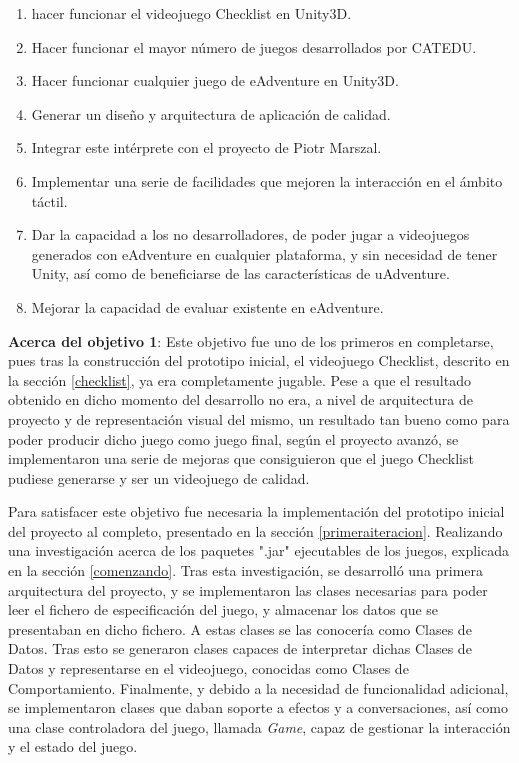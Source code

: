 \begin{enumerate}
	\item hacer funcionar el videojuego Checklist en Unity3D.
	
	\item Hacer funcionar el mayor número de juegos desarrollados por CATEDU.
	
	\item Hacer funcionar cualquier juego de eAdventure en Unity3D.
	
	\item Generar un diseño y arquitectura de aplicación de calidad.
	
	\item Integrar este intérprete con el proyecto de Piotr Marszal.
	
	\item Implementar una serie de facilidades que mejoren la interacción en el ámbito táctil.
	
	\item Dar la capacidad a los no desarrolladores, de poder jugar a videojuegos generados con eAdventure en cualquier plataforma, y sin necesidad de tener Unity, así como de beneficiarse de las características de uAdventure.
	
	\item Mejorar la capacidad de evaluar existente en eAdventure.
\end{enumerate}

\textbf{Acerca del objetivo 1}: Este objetivo fue uno de los primeros en completarse, pues tras la construcción del prototipo inicial, el videojuego Checklist, descrito en la sección \ref{checklist}, ya era completamente jugable. Pese a que el resultado obtenido en dicho momento del desarrollo no era, a nivel de arquitectura de proyecto y de representación visual del mismo, un resultado tan bueno como para poder producir dicho juego como juego final, según el proyecto avanzó, se implementaron una serie de mejoras que consiguieron que el juego Checklist pudiese generarse y ser un videojuego de calidad.

Para satisfacer este objetivo fue necesaria la implementación del prototipo inicial del proyecto al completo, presentado en la sección \ref{primeraiteracion}. Realizando una investigación acerca de los paquetes ".jar" ejecutables de los juegos, explicada en la sección \ref{comenzando}. Tras esta investigación, se desarrolló una primera arquitectura del proyecto, y se implementaron las clases necesarias para poder leer el fichero de especificación del juego, y almacenar los datos que se presentaban en dicho fichero. A estas clases se las conocería como Clases de Datos. Tras esto se generaron clases capaces de interpretar dichas Clases de Datos y representarse en el videojuego, conocidas como Clases de Comportamiento. Finalmente, y debido a la necesidad de funcionalidad adicional, se implementaron clases que daban soporte a efectos y a conversaciones, así como una clase controladora del juego, llamada \textit{Game}, capaz de gestionar la interacción y el estado del juego.

